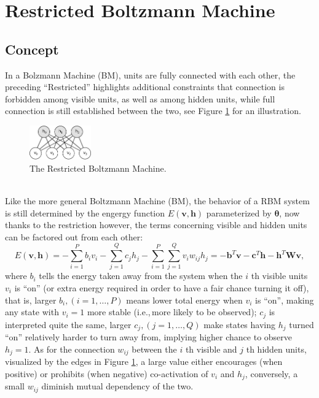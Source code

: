 \documentclass[11pt]{article}
\newcommand{\vb}{\boldsymbol{b}}
\newcommand{\vc}{\boldsymbol{c}}
\newcommand{\vh}{\boldsymbol{h}}
\newcommand{\vv}{\boldsymbol{v}}
\newcommand{\mw}{\boldsymbol{W}}
\newcommand{\pEC}{\boldsymbol{\theta}}
\begin{document}
{\section{Restricted Boltzmann Machine}
\subsection{Concept}
In a Bolzmann Machine (BM), units are fully connected with each other, the preceding ``Restricted'' highlights additional constraints that connection is forbidden among visible units, as well as among hidden units, while full connection is still established between the two, see Figure \ref{fig:rbm} for an illustration.
\begin{figure}[h]
  \centering
  \includegraphics[width=100px]{img/rbm.png}
  \caption{The Restricted Boltzmann Machine.}\label{fig:rbm}
\end{figure} \\
Like the more general Boltzmann Machine (BM), the behavior of a RBM system is still determined by the engergy function $E(\vv, \vh)$ parameterized by $\pEC$, now thanks to the restriction however, the terms concerning visible and hidden units can be factored out from each other:
\begin{equation} \label{eq:rbm:e(s)}
  E(\vv, \vh) = -\sum_{i=1}^{P}{b_i v_i} - \sum_{j=1}^{Q}{c_j h_j} - \sum_{i=1}^P\sum_{j=1}^Q{v_i w_{ij} h_j} = -\vb^T \vv - \vc^T \vh - \vh^T \mw \vv,
\end{equation}
where $b_i$ tells the energy taken away from the system when the $i$ th visible units $v_i$ is ``on'' (or extra energy required in order to have a fair chance turning it off), that is, larger $b_i, (i=1, \dots, P)$ means lower total energy when $v_i$ is ``on'', making any state with $v_i=1$ more stable (i.e.,\,more likely to be observed); $c_j$ is interpreted quite the same, larger $c_j, (j=1, \dots, Q)$ make states having $h_j$ turned ``on'' relatively harder to turn away from, implying higher chance to observe $h_j=1$. As for the connection $w_{ij}$ between the $i$ th visible and $j$ th hidden units, visualized by the edges in Figure \ref{fig:rbm}, a large value either encourages (when positive) or prohibits (when negative) co-activation of $v_i$ and $h_j$, conversely, a small $w_{ij}$ diminish mutual dependency of the two.
}
\end{document}
